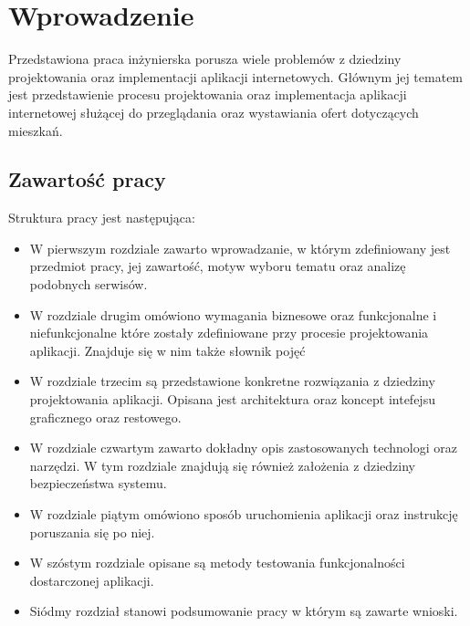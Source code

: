 \chapter{Wprowadzenie}
\label{cha:wprowadzenie}

Przedstawiona praca inżynierska porusza wiele problemów z dziedziny projektowania oraz implementacji aplikacji internetowych. Głównym jej tematem jest przedstawienie procesu projektowania oraz implementacja aplikacji internetowej służącej do przeglądania oraz wystawiania ofert dotyczących mieszkań.


\section{Zawartość pracy}
\label{sec:zawartoscPracy}
Struktura pracy jest następująca: 
\begin{itemize}
\item W pierwszym rozdziale zawarto wprowadzanie, w którym zdefiniowany jest przedmiot pracy, jej zawartość, motyw wyboru tematu oraz analizę podobnych serwisów. 
\item W rozdziale drugim omówiono wymagania biznesowe oraz funkcjonalne i niefunkcjonalne które zostały zdefiniowane przy procesie projektowania aplikacji. Znajduje się w nim także słownik pojęć 
\item W rozdziale trzecim są przedstawione konkretne rozwiązania z dziedziny projektowania aplikacji. Opisana jest architektura oraz koncept intefejsu graficznego oraz restowego. 
\item W rozdziale czwartym zawarto dokładny opis zastosowanych technologi oraz narzędzi. W tym rozdziale znajdują  się również założenia z dziedziny bezpieczeństwa systemu.
\item W rozdziale piątym omówiono sposób uruchomienia aplikacji oraz instrukcję poruszania się po niej.
\item W szóstym rozdziale opisane są metody testowania funkcjonalności dostarczonej aplikacji. 
\item Siódmy rozdział stanowi podsumowanie pracy w którym są zawarte wnioski.
\end{itemize}


